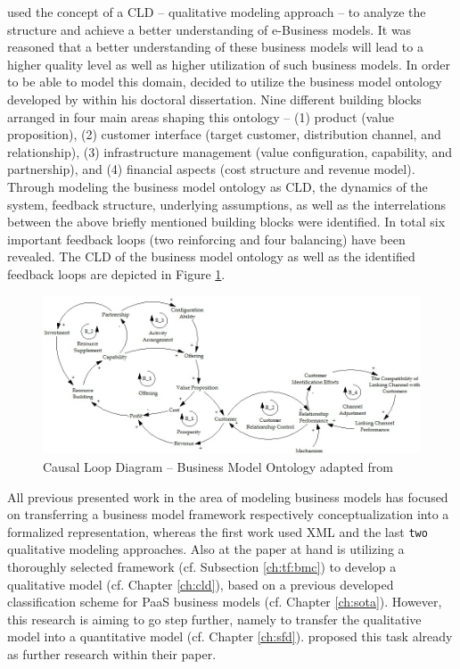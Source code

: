\citet{Kiani2009} used the concept of a \ac{CLD} -- qualitative modeling approach -- to analyze the structure and achieve a better understanding of e-Business models. It was reasoned that a better understanding of these business models will lead to a higher quality level as well as higher utilization of such business models. In order to be able to model this domain, \citet{Kiani2009} decided to utilize the business model ontology developed by \citet{Osterwalder2004} within his doctoral dissertation. Nine different building blocks arranged in four main areas shaping this ontology -- (1) product (value proposition), (2) customer interface (target customer, distribution channel, and relationship), (3) infrastructure management (value configuration, capability, and partnership), and (4) financial aspects (cost structure and revenue model). Through modeling the business model ontology as \ac{CLD}, the dynamics of the system, feedback structure, underlying assumptions, as well as the interrelations between the above briefly mentioned building blocks were identified. In total six important feedback loops (two reinforcing and four balancing) have been revealed. The \ac{CLD} of the business model ontology as well as the identified feedback loops are depicted in Figure \ref{fig:cld_ki}.

\begin{figure}[tb]
	\centering
	\includegraphics[width=\textwidth]{gfx/cld_kiani}
	\caption[Causal Loop Diagram -- Business Model Ontology]{Causal Loop Diagram -- Business Model Ontology adapted from \citet[p. 164]{Kiani2009}}
	\label{fig:cld_ki}
\end{figure}

All previous presented work in the area of modeling business models has focused on transferring a business model framework respectively conceptualization into a formalized representation, whereas the first work used \ac{XML} and the last \texttt{two} qualitative modeling approaches. Also at the paper at hand is utilizing a thoroughly selected framework (cf. Subsection \ref{ch:tf:bmc}) to develop a qualitative model (cf. Chapter \ref{ch:cld}), based on a previous developed classification scheme for \ac{PaaS} business models (cf. Chapter \ref{ch:sota}). However, this research is aiming to go step further, namely to transfer the qualitative model into a quantitative model (cf. Chapter \ref{ch:sfd}). \citet{Kiani2009} proposed this task already as further research within their paper.


